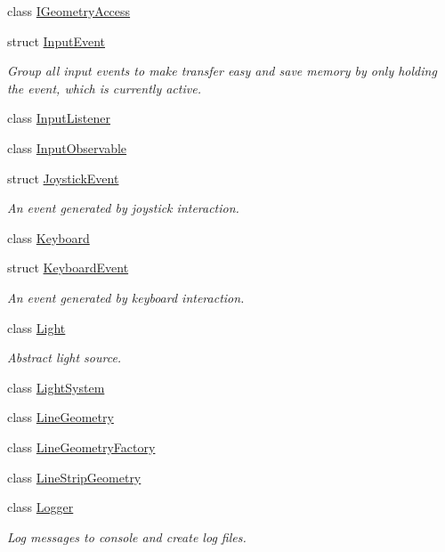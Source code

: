 \begin{DoxyCompactItemize}
class \mbox{\hyperlink{classec_1_1_i_geometry_access}{I\+Geometry\+Access}}
\item 
struct \mbox{\hyperlink{structec_1_1_input_event}{Input\+Event}}
\begin{DoxyCompactList}\small\item\em Group all input events to make transfer easy and save memory by only holding the event, which is currently active. \end{DoxyCompactList}\item 
class \mbox{\hyperlink{classec_1_1_input_listener}{Input\+Listener}}
\item 
class \mbox{\hyperlink{classec_1_1_input_observable}{Input\+Observable}}
\item 
struct \mbox{\hyperlink{structec_1_1_joystick_event}{Joystick\+Event}}
\begin{DoxyCompactList}\small\item\em An event generated by joystick interaction. \end{DoxyCompactList}\item 
class \mbox{\hyperlink{classec_1_1_keyboard}{Keyboard}}
\item 
struct \mbox{\hyperlink{structec_1_1_keyboard_event}{Keyboard\+Event}}
\begin{DoxyCompactList}\small\item\em An event generated by keyboard interaction. \end{DoxyCompactList}\item 
class \mbox{\hyperlink{classec_1_1_light}{Light}}
\begin{DoxyCompactList}\small\item\em Abstract light source. \end{DoxyCompactList}\item 
class \mbox{\hyperlink{classec_1_1_light_system}{Light\+System}}
\item 
class \mbox{\hyperlink{classec_1_1_line_geometry}{Line\+Geometry}}
\item 
class \mbox{\hyperlink{classec_1_1_line_geometry_factory}{Line\+Geometry\+Factory}}
\item 
class \mbox{\hyperlink{classec_1_1_line_strip_geometry}{Line\+Strip\+Geometry}}
\item 
class \mbox{\hyperlink{classec_1_1_logger}{Logger}}
\begin{DoxyCompactList}\small\item\em Log messages to console and create log files. \end{DoxyCompactList}\item 

\end{DoxyCompactItemize}
